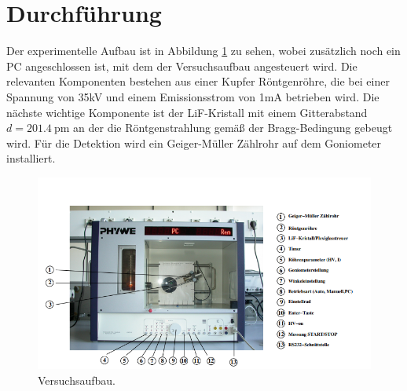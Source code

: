 \section{Durchführung}
\label{sec:Durchführung}
Der experimentelle Aufbau ist in Abbildung \ref{fig:Aufbau} zu sehen, wobei zusätzlich noch ein PC angeschlossen ist, mit 
dem der Versuchsaufbau angesteuert wird. Die relevanten Komponenten bestehen aus einer Kupfer Röntgenröhre, die bei einer Spannung von 35kV
und einem Emissionsstrom von 1mA betrieben wird. Die nächste wichtige Komponente ist der LiF-Kristall mit einem 
Gitterabstand $d=\qty{201.4}{\pico\meter}$ an der die Röntgenstrahlung gemäß der Bragg-Bedingung gebeugt wird.
Für die Detektion wird ein Geiger-Müller Zählrohr auf dem Goniometer installiert.
\begin{figure}[H]
    \centering
    \includegraphics[scale=1]{content/Aufbau.png}
    \caption{Versuchsaufbau\cite{sample}.}
    \label{fig:Aufbau}
\end{figure}

